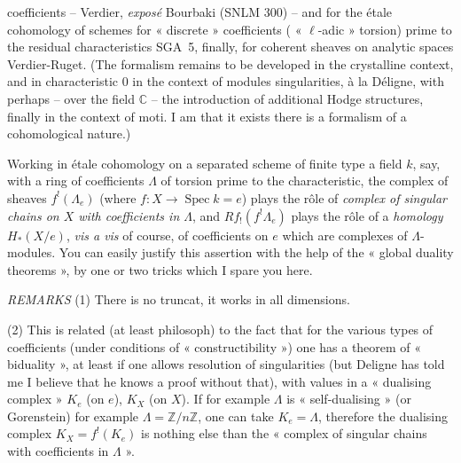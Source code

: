 \documentclass[11pt,a4paper]{article}
\begin{document}
coefficients -- Verdier, \emph{exposé} Bourbaki (SNLM 300) -- and for the étale cohomology of schemes for « discrete » coefficients ( « $\ell$-adic »  torsion) prime to the residual characteristics \add{(}SGA~5\add{)}, finally, for coherent sheaves on analytic spaces \add{(}Verdier-Ruget\add{)}. (The formalism remains to be developed in the crystalline context, and in characteristic $0$ in the context of  modules   singularities, à la Déligne, with perhaps -- over the field $\mathbb{C}$ -- the introduction of additional Hodge structures, finally in the context of moti. I am   that it exists   there is a formalism of a cohomological nature.)

Working in étale cohomology on a separated scheme of finite type   a field $k$, say, with a ring of coefficients $\Lambda$ of torsion prime to the characteristic, the complex of sheaves $f^!(\Lambda_e)$ (where $f\colon X \to \operatorname{Spec} k = e$) plays the rôle of \emph{complex of singular chains on $X$ with coefficients in $\Lambda$}, and $Rf_!(f^!\Lambda_e)$ plays the rôle of a \emph{homology} $H_*(X/e)$, \emph{vis a vis} of course, of coefficients on $e$ which are complexes of $\Lambda$-modules. You can easily justify this assertion with the help of the « global duality theorems », by one or two tricks which I spare you here.

\emph{REMARKS} (1) There is no  truncat, it works in all dimensions.

(2) This is related (at least   philosoph) to the fact that for the various types of coefficients (under conditions of « constructibility ») one has a theorem of « biduality », at least if one allows resolution of singularities (but Deligne has told me I believe that he knows a proof without that), with values in a « dualising complex » $K_e$ (on $e$), $K_X$ (on $X$). If for example $\Lambda$ is « self-dualising » (or Gorenstein) for example $\Lambda = \mathbb{Z}/n\mathbb{Z}$, one can take $K_e = \Lambda$, therefore the dualising complex $K_X = f^!(K_e)$ is nothing else than the « complex of singular chains with coefficients in $\Lambda$ ».
\end{document}
